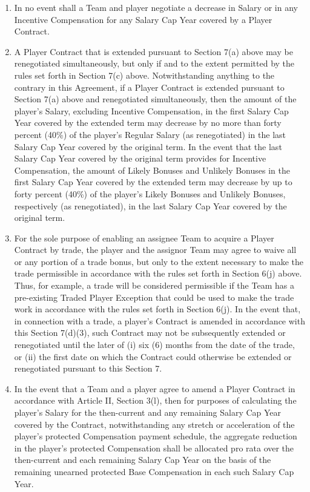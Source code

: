 \documentclass[
]{book}
\providecommand{\tightlist}{%
  \setlength{\itemsep}{0pt}\setlength{\parskip}{0pt}}
\begin{document}
\begin{enumerate}
  \begin{enumerate}
  \def\labelenumii{(\arabic{enumii})}
  \tightlist
  \item
    In no event shall a Team and player negotiate a decrease in Salary or in any Incentive Compensation for any Salary Cap Year covered by a Player Contract.
  \item
    A Player Contract that is extended pursuant to Section 7(a) above may be renegotiated simultaneously, but only if and to the extent permitted by the rules set forth in Section 7(c) above. Notwithstanding anything to the contrary in this Agreement, if a Player Contract is extended pursuant to Section 7(a) above and renegotiated simultaneously, then the amount of the player's Salary, excluding Incentive Compensation, in the first Salary Cap Year covered by the extended term may decrease by no more than forty percent (40\%) of the player's Regular Salary (as renegotiated) in the last Salary Cap Year covered by the original term. In the event that the last Salary Cap Year covered by the original term provides for Incentive Compensation, the amount of Likely Bonuses and Unlikely Bonuses in the first Salary Cap Year covered by the extended term may decrease by up to forty percent (40\%) of the player's Likely Bonuses and Unlikely Bonuses, respectively (as renegotiated), in the last Salary Cap Year covered by the original term.
  \item
    For the sole purpose of enabling an assignee Team to acquire a Player Contract by trade, the player and the assignor Team may agree to waive all or any portion of a trade bonus, but only to the extent necessary to make the trade permissible in accordance with the rules set forth in Section 6(j) above. Thus, for example, a trade will be considered permissible if the Team has a pre-existing Traded Player Exception that could be used to make the trade work in accordance with the rules set forth in Section 6(j). In the event that, in connection with a trade, a player's Contract is amended in accordance with this Section 7(d)(3), such Contract may not be subsequently extended or renegotiated until the later of (i) six (6) months from the date of the trade, or (ii) the first date on which the Contract could otherwise be extended or renegotiated pursuant to this Section 7.
  \item
    In the event that a Team and a player agree to amend a Player Contract in accordance with Article II, Section 3(l), then for purposes of calculating the player's Salary for the then-current and any remaining Salary Cap Year covered by the Contract, notwithstanding any stretch or acceleration of the player's protected Compensation payment schedule, the aggregate reduction in the player's protected Compensation shall be allocated pro rata over the then-current and each remaining Salary Cap Year on the basis of the remaining unearned protected Base Compensation in each such Salary Cap Year.

\end{enumerate}
\end{enumerate}
\end{document}
